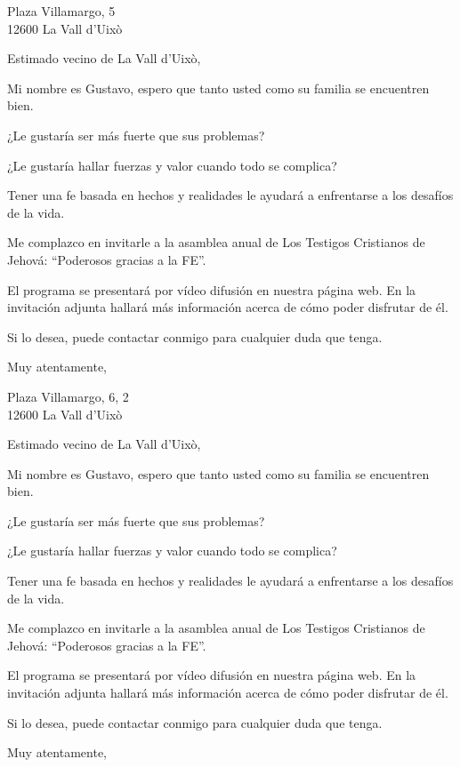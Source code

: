 \documentclass{scrlttr2}
\date{\today}
\begin{document}
\begin{letter}{%
Plaza Villamargo, 5\\
12600 La Vall d'Uixò\\
}
\opening{Estimado vecino de La Vall d'Uixò,}

Mi nombre es Gustavo, espero que tanto usted como su familia se encuentren bien.

¿Le gustaría ser más fuerte que sus problemas?

¿Le gustaría hallar fuerzas y valor cuando todo se complica?

Tener una fe basada en hechos y realidades le ayudará a enfrentarse a los desafíos de la vida.

Me complazco en invitarle a la asamblea anual de Los Testigos Cristianos de Jehová: ``Poderosos gracias a la FE''.

El programa se presentará por vídeo difusión en nuestra página web. En la invitación adjunta hallará más información acerca de cómo poder disfrutar de él.

Si lo desea, puede contactar conmigo para cualquier duda que tenga.

\closing{Muy atentamente,}


\end{letter}
\begin{letter}{%
Plaza Villamargo, 6, 2\\
12600 La Vall d'Uixò\\
}
\opening{Estimado vecino de La Vall d'Uixò,}

Mi nombre es Gustavo, espero que tanto usted como su familia se encuentren bien.

¿Le gustaría ser más fuerte que sus problemas?

¿Le gustaría hallar fuerzas y valor cuando todo se complica?

Tener una fe basada en hechos y realidades le ayudará a enfrentarse a los desafíos de la vida.

Me complazco en invitarle a la asamblea anual de Los Testigos Cristianos de Jehová: ``Poderosos gracias a la FE''.

El programa se presentará por vídeo difusión en nuestra página web. En la invitación adjunta hallará más información acerca de cómo poder disfrutar de él.

Si lo desea, puede contactar conmigo para cualquier duda que tenga.

\closing{Muy atentamente,}


\end{letter}
\end{document}
